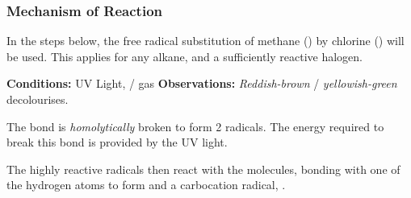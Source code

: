 	\subsubsection{Mechanism of Reaction}

		In the steps below, the free radical substitution of methane () by chlorine () will be used. This applies
		for any alkane, and a sufficiently reactive halogen.

		\vspace{1.5em}

		\vbox{\textbf{Conditions:} \tabto{35mm}UV Light,  /  gas}	%
		\vbox{\textbf{Observations:} \tabto{35mm}\textit{\color{Mahogany}Reddish-brown}  / \textit{\color{YellowGreen}yellowish-green}  decolourises.}


			The \ch{\chlorine-\chlorine} bond is \textit{homolytically} broken to form 2 \ch{\chlorine} radicals.
			The energy required to break this bond is provided by the UV light.




			The highly reactive \ch{\chlorine} radicals then react with the  molecules, bonding with one of the
			hydrogen atoms to form  and a carbocation radical, .



